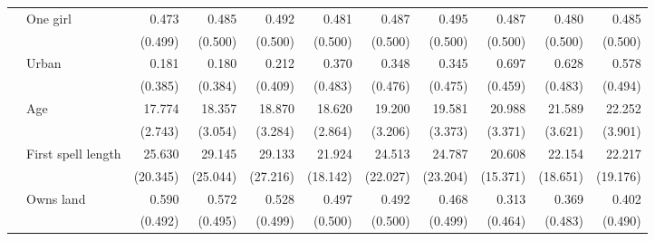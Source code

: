 \documentclass[12pt,letterpaper]{article}
\begin{document}
\begin{table}[htp]
\begin{center}
\begin{scriptsize}
\begin{threeparttable}
\begin{tabular} {@{} c l D{.}{.}{1.3} D{.}{.}{1.3} D{.}{.}{1.3} D{.}{.}{1.3} D{.}{.}{1.3} D{.}{.}{1.3} D{.}{.}{1.3} D{.}{.}{1.3} D{.}{.}{1.3} @{}}
                    & One girl            &       0.473         &       0.485         &       0.492         &       0.481         &       0.487         &       0.495         &       0.487         &       0.480         &       0.485         \\
                    &                     &     (0.499)         &     (0.500)         &     (0.500)         &     (0.500)         &     (0.500)         &     (0.500)         &     (0.500)         &     (0.500)         &     (0.500)         \\
                    & Urban               &       0.181         &       0.180         &       0.212         &       0.370         &       0.348         &       0.345         &       0.697         &       0.628         &       0.578         \\
                    &                     &     (0.385)         &     (0.384)         &     (0.409)         &     (0.483)         &     (0.476)         &     (0.475)         &     (0.459)         &     (0.483)         &     (0.494)         \\
                    & Age                 &      17.774         &      18.357         &      18.870         &      18.620         &      19.200         &      19.581         &      20.988         &      21.589         &      22.252         \\
                    &                     &     (2.743)         &     (3.054)         &     (3.284)         &     (2.864)         &     (3.206)         &     (3.373)         &     (3.371)         &     (3.621)         &     (3.901)         \\
                    & First spell length  &      25.630         &      29.145         &      29.133         &      21.924         &      24.513         &      24.787         &      20.608         &      22.154         &      22.217         \\
                    &                     &    (20.345)         &    (25.044)         &    (27.216)         &    (18.142)         &    (22.027)         &    (23.204)         &    (15.371)         &    (18.651)         &    (19.176)         \\
                    & Owns land           &       0.590         &       0.572         &       0.528         &       0.497         &       0.492         &       0.468         &       0.313         &       0.369         &       0.402         \\
                    &                     &     (0.492)         &     (0.495)         &     (0.499)         &     (0.500)         &     (0.500)         &     (0.499)         &     (0.464)         &     (0.483)         &     (0.490)         \\

\end{tabular}
\end{threeparttable}
\end{scriptsize}
\end{center}
\end{table}
\end{document}
